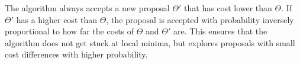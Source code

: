 The algorithm always accepts a new proposal $\Theta'$
that has cost lower than $\Theta$. If $\Theta'$ has a 
higher cost than $\Theta$, the proposal is
accepted with probability inversely proportional to
how far the costs of $\Theta$ and $\Theta'$ are. This ensures that 
the algorithm does not get stuck at local minima, but 
explores proposals with small cost differences with 
higher probability.

\iffull
\begin{algorithm}[t]
	\label{dcsyn}
	\begin{algorithmic}[1] \label{alg:mcmc}
		\EndWhile
		\EndProcedure
		
%		
	\end{algorithmic}
\end{algorithm}
\fi

